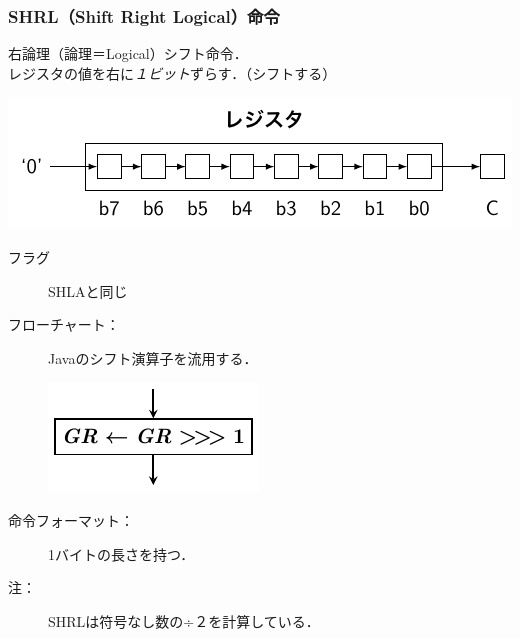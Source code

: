 \documentclass{beamer}                 %
\begin{document}
\begin{frame}
  \frametitle{SHRL（Shift Right Logical）命令}
  右論理（論理＝Logical）シフト命令．\\
  レジスタの値を右に\emph{１ビット}ずらす．（シフトする）
  \vfill
  \centerline{\includegraphics[scale=0.7]{../Tikz/shft3.pdf}}
  \vfill
  \begin{description}
  \item[フラグ] SHLAと同じ
    \vfill
  \item[フローチャート：] Javaのシフト演算子を流用する．\\
    \centerline{\includegraphics[scale=0.7]{../Tikz/shrl.pdf}}
    \vfill
  \item[命令フォーマット：] 1バイトの長さを持つ．\\
  \item[注：] SHRLは符号なし数の÷２を計算している．\\
  \end{description}
  \vfill
\end{frame}
\end{document}
